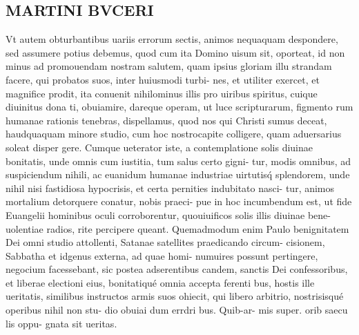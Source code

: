 \documentclass{article}
\begin{document}
\begin{pages}
\section*{MARTINI BVCERI }\pstart Vt autem obturbantibus   uariis errorum sectis, animos nequaquam despondere, sed assumere potius debemus, quod cum ita Domino uisum sit, oporteat, id non minus ad promouendam nostram salutem, quam ipsius gloriam illu strandam facere, qui probatos suos, inter huiusmodi turbi- nes, et utiliter exercet, et magnifice prodit, ita conuenit nihilominus illis pro uiribus spiritus, cuique diuinitus dona ti, obuiamire, dareque operam, ut luce scripturarum, figmento rum humanae rationis tenebras, dispellamus, quod nos qui Christi sumus deceat, haudquaquam minore studio, cum hoc nostrocapite colligere, quam aduersarius soleat disper gere. Cumque ueterator iste, a contemplatione solis diuinae bonitatis, unde omnis cum iustitia, tum salus certo gigni- tur, modis omnibus, ad suspiciendum nihili, ac euanidum humanae industriae uirtutisq́ splendorem, unde nihil nisi fastidiosa hypocrisis, et certa pernities indubitato nasci- tur, animos mortalium detorquere conatur, nobis praeci- pue in hoc incumbendum est, ut fide Euangelii hominibus oculi corroborentur, quouiuificos solis illis diuinae bene- uolentiae radios, rite percipere queant.  \pend\pstart Quemadmodum enim Paulo benignitatem Dei omni studio attollenti, Satanae satellites praedicando circum- cisionem, Sabbatha et idgenus externa, ad quae homi- numuires possunt pertingere, negocium facessebant, sic postea adserentibus candem, sanctis Dei confessoribus, et liberae electioni eius, bonitatiqué omnia accepta ferenti bus, hostis ille ueritatis, similibus instructos armis suos ohiecit, qui libero arbitrio, nostrisisqué operibus nihil non  \pendQuo stu- dio obuiai dum errdri bus. Quib-ar- mis super. orib saecu lis oppu- gnata sit ueritas. 

\end{pages}
\end{document}
